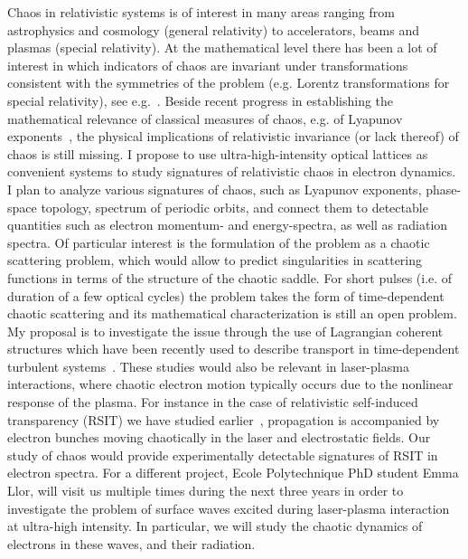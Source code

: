 \documentclass[11pt,a4paper,final]{moderncv}
\begin{document}
Chaos in relativistic systems is of interest in many areas ranging from astrophysics and cosmology (general relativity)
to accelerators, beams and plasmas (special relativity). At the mathematical level there has been a lot
of interest in which indicators of chaos are invariant under transformations consistent with the symmetries of
the problem (e.g. Lorentz transformations for special relativity), see e.g.~\cite{motter03,motter09-1}. Beside recent progress 
in establishing the mathematical 
relevance of classical measures of chaos, e.g. of Lyapunov exponents~\cite{motter03,motter09-1}, 
the physical implications of relativistic invariance (or lack thereof) of chaos is still missing.
I propose to use ultra-high-intensity optical lattices as convenient systems to study
signatures of relativistic chaos in electron dynamics.
I plan to analyze various signatures of chaos, such as
Lyapunov exponents, phase-space topology, spectrum of periodic orbits, and connect them to detectable quantities such
as electron momentum- and energy-spectra, as well as radiation spectra. Of particular interest is the formulation of
the problem as a chaotic scattering problem, which would allow to predict singularities in scattering functions in terms of
the structure of the chaotic saddle. For short pulses (i.e. of duration of a few optical cycles)
the problem takes the form of time-dependent chaotic scattering and its mathematical characterization is still an open
problem. My proposal is to investigate the issue through the use of Lagrangian coherent structures which have been recently used
to describe transport in time-dependent turbulent systems~\cite{MHPRS07}. These studies would also be relevant in laser-plasma
interactions, where chaotic electron motion typically occurs due to the nonlinear response of the plasma. 
For instance in the case of relativistic self-induced transparency (RSIT) we have studied earlier~\cite{siminos2012}, 
propagation is accompanied by electron bunches moving chaotically in the laser and electrostatic fields. 
Our study of chaos would provide experimentally detectable signatures of RSIT in electron spectra. For a different
project, Ecole Polytechnique PhD student Emma Llor, will visit us multiple times during the next three years
in order to investigate the problem of surface waves excited during laser-plasma interaction at ultra-high intensity.
In particular, we will study the chaotic dynamics of electrons in these waves, 
and their radiation. \\ \\ \\ 


\end{document}

